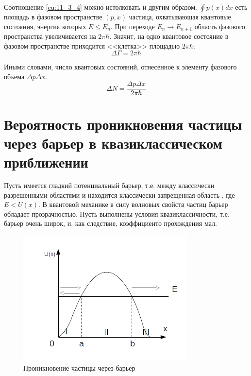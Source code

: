 Соотношение \eqref{eq:11_3_4} можно истолковать и другим образом. $\oint p(x)dx$ есть площадь в фазовом пространстве $(p,x)$ частица, охватывающая квантовые состояния, энергия которых $E \le E_n$. При переходе $E_n \to E_{n+1}$ область фазового пространства увеличивается на $2\pi\hbar$. Значит, на одно квантовое состояние в фазовом пространстве приходится <<клетка>> площадью $2\pi \hbar$:
$$
\boxed{\Delta\Gamma = 2\pi\hbar}
$$

Иными словами, число квантовых состояний, отнесенное к элементу фазового объема $\Delta p \Delta x$.
$$
\boxed{\Delta N = \frac{\Delta p \Delta x}{2\pi\hbar}}
$$

\begin{sloppypar}
  \section{Вероятность проникновения частицы через барьер в квазиклассическом приближении}
\end{sloppypar}

Пусть имеется гладкий потенциальный барьер, т.е. между классически разрешенными областями  и  находится классически запрещенная область , где $E < U(x)$. В квантовой механике в силу волновых свойств частиц барьер обладает прозрачностью. Пусть выполнены условия квазиклассичности, т.е. барьер очень широк, и, как следствие, коэффициенто прохождения мал. 

\begin{figure}[h]
\centering
\includegraphics[scale=1]{figs/11_5}
\caption{Проникновение частицы через барьер}
\label{fig:11_5}
\end{figure}

